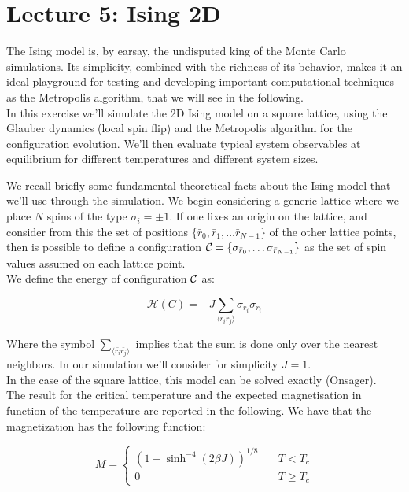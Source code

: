 \chapter*{Lecture 5: Ising 2D}

The Ising model is, by earsay, the undisputed king of the Monte Carlo simulations. Its simplicity, combined with the richness of its behavior, 
makes it an ideal playground for testing and developing important computational techniques as the Metropolis algorithm, that we will 
see in the following. \\
In this exercise we'll simulate the 2D Ising model on a square lattice, using the Glauber dynamics (local spin flip) and the Metropolis algorithm
for the configuration evolution. We'll then evaluate typical system observables at equilibrium for different temperatures and different system sizes.

We recall briefly some fundamental theoretical facts about the Ising model that we'll use through the simulation.
We begin considering a generic lattice where we place $N$ spins of the type $\sigma_i  = \pm 1$. If one fixes an origin on the lattice, and consider
from this the set of positions $\{\bar{r}_0, \bar{r}_1, \dots \bar{r}_{N-1}\}$ of the other lattice points, then is possible 
to define a configuration $\mathcal{C} = \{\sigma_{\bar{r}_0}, \dots \sigma_{\bar{r}_{N-1}}\}$ as the set of spin values assumed on each lattice point. \\
We define the energy of configuration $\mathcal{C}$ as:

$$
\mathcal{H}(C) = -J \sum_{\langle \bar{r_i}\bar{r_j} \rangle} \sigma_{\bar{r_i}} \sigma_{\bar{r_i}}
$$

Where the symbol $\sum_{\langle \bar{r_i}\bar{r_j} \rangle}$ implies that the sum is done only over the nearest neighbors. In our simulation 
we'll consider for simplicity $J=1$. \\

In the case of the square lattice, this model can be solved exactly (Onsager). \\
The result for the critical temperature and the expected magnetisation in function
of the temperature are reported in the following.
We have that the magnetization has the following function:

$$
M = 
\begin{cases}
(1-\sinh^{-4}(2\beta J))^{1/8} \quad&T<T_c\\
0 &T \geq T_c    
\end{cases}
$$

